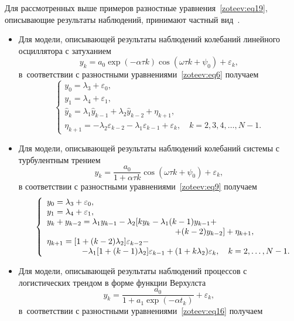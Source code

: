 Для рассмотренных выше примеров разностные уравнения~\eqref{zoteev:eq19}, описывающие результаты наблюдений, принимают частный вид~\cite{zot:10}.
\begin{itemize}
\item[1.] Для модели, описывающей результаты наблюдений колебаний линейного осциллятора с затуханием $$y_k=a_0\exp(-\alpha\tau k)\cos(\omega\tau k+\psi_0)+\varepsilon_k,
$$ в~соответствии с разностными уравнениями~\eqref{zoteev:eq6} получаем%
\begin{equation}
\left\{
\begin{array}{l}
{y_0=\lambda_3+\varepsilon_0,} \\
{y_1=\lambda_4+\varepsilon_1,} \\
{\hat{y}_k=\lambda_1\hat{y}_{k-1}+\lambda_2\hat{y}_{k-2}+\eta_{k+1},} \\
\eta_{k+1}=-\lambda_2\varepsilon_{k-2}-\lambda_1\varepsilon_{k-1}+\varepsilon_k, \quad k=2,3,4,\dots,N-1.
\end{array}
\right.
\label{zoteev:eq20}
\end{equation}
\item[2.] Для модели, описывающей результаты наблюдений колебаний системы с турбулентным трением 
$$y_k=\dfrac{a_0}{1+\alpha\tau k}\cos(\omega\tau k+\psi_0)+\varepsilon_k,
$$ 
в соответствии с разностными уравнениями~\eqref{zoteev:eq9} получаем%
\begin{equation}
\left\{
\begin{array}{l}
y_0=\lambda_3+\varepsilon_0, \\
y_1=\lambda_4+\varepsilon_1,  \\
y_k+y_{k-2}=\lambda_1y_{k-1}-\lambda_2[ky_k-\lambda_1(k-1)y_{k-1} + \\
\hspace{5.5cm}  +(k-2)y_{k-2}]+\eta_{k+1}, \\
\eta_{k+1}=[1+(k-2)\lambda_2]\varepsilon_{k-2} - \\
\hspace{1.5cm}  
 -\lambda_1[1+(k-1)\lambda_2]\varepsilon_{k-1}+ (1+k\lambda_2)\varepsilon_k, 
 \quad k=2,\dots,N-1.
\end{array} \hspace{-5mm}
\right.
\label{zoteev:eq21}
\end{equation}
\item[3.] Для модели, описывающей результаты наблюдений процессов с логистических трендом в форме функции Верхулста $$
y_k=\dfrac{a_0}{1+a_1\exp(-\alpha t_k)}+\varepsilon_k,
$$ 
в~соответствии с разностными уравнениями~\eqref{zoteev:eq16} получаем

\end{itemize}
